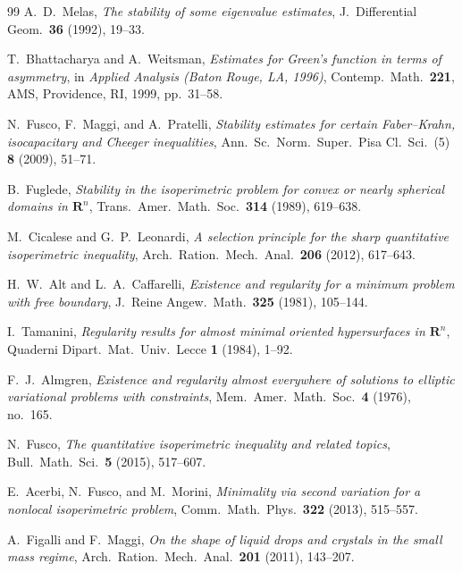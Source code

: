 \documentclass[11pt]{amsart}
\theoremstyle{definition}
\begin{document}
\begin{thebibliography}{99}
A.~D.~Melas,
\emph{The stability of some eigenvalue estimates},
J.\ Differential Geom.\ \textbf{36} (1992), 19--33.

T.~Bhattacharya and A.~Weitsman,
\emph{Estimates for Green's function in terms of asymmetry},
in \emph{Applied Analysis (Baton Rouge, LA, 1996)}, Contemp.\ Math.\
\textbf{221}, AMS, Providence, RI, 1999, pp.~31--58.

N.~Fusco, F.~Maggi, and A.~Pratelli,
\emph{Stability estimates for certain Faber--Krahn, isocapacitary and
Cheeger inequalities},
Ann.\ Sc.\ Norm.\ Super.\ Pisa Cl.\ Sci.\ (5) \textbf{8} (2009), 51--71.

B.~Fuglede,
\emph{Stability in the isoperimetric problem for convex or nearly spherical
domains in $\mathbf R^n$},
Trans.\ Amer.\ Math.\ Soc.\ \textbf{314} (1989), 619--638.

M.~Cicalese and G.~P.~Leonardi,
\emph{A selection principle for the sharp quantitative isoperimetric
inequality},
Arch.\ Ration.\ Mech.\ Anal.\ \textbf{206} (2012), 617--643.

H.~W.~Alt and L.~A.~Caffarelli,
\emph{Existence and regularity for a minimum problem with free boundary},
J.\ Reine Angew.\ Math.\ \textbf{325} (1981), 105--144.

I.~Tamanini,
\emph{Regularity results for almost minimal oriented hypersurfaces in
$\mathbf R^n$},
Quaderni Dipart.\ Mat.\ Univ.\ Lecce \textbf{1} (1984), 1--92.

F.~J.~Almgren,
\emph{Existence and regularity almost everywhere of solutions to elliptic
variational problems with constraints},
Mem.\ Amer.\ Math.\ Soc.\ \textbf{4} (1976), no.~165.

N.~Fusco,
\emph{The quantitative isoperimetric inequality and related topics},
Bull.\ Math.\ Sci.\ \textbf{5} (2015), 517--607.

E.~Acerbi, N.~Fusco, and M.~Morini,
\emph{Minimality via second variation for a nonlocal isoperimetric
problem},
Comm.\ Math.\ Phys.\ \textbf{322} (2013), 515--557.

A.~Figalli and F.~Maggi,
\emph{On the shape of liquid drops and crystals in the small mass regime},
Arch.\ Ration.\ Mech.\ Anal.\ \textbf{201} (2011), 143--207.


\end{thebibliography}
\end{document}
